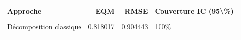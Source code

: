 \centering
\centering
\begin{tabular}[t]{lrrl}
\toprule
Approche & EQM & RMSE & Couverture IC (95\textbackslash{}\%)\\
\midrule
\cellcolor{gray!10}{Lissage exponentiel (Holt-Winters)} & \cellcolor{gray!10}{0.050248} & \cellcolor{gray!10}{0.224160} & \cellcolor{gray!10}{100\%}\\
Décomposition classique & 0.818017 & 0.904443 & 100\%\\
\cellcolor{gray!10}{Modélisation stochastique (SARIMA)} & \cellcolor{gray!10}{0.772160} & \cellcolor{gray!10}{0.878727} & \cellcolor{gray!10}{100\%}\\
\bottomrule
\end{tabular}

